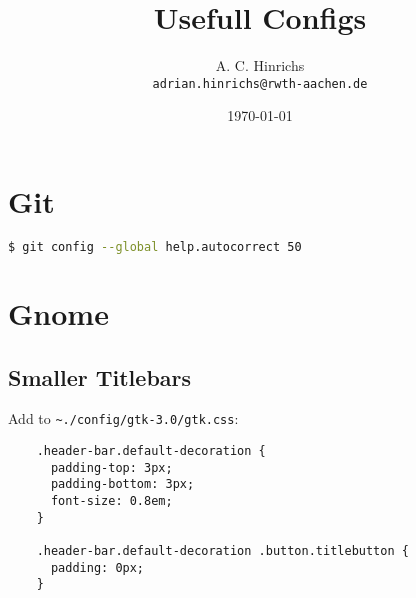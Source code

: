 \documentclass[10pt,landscape,a4paper]{CheatSheet}
\title{Usefull Configs}
\author{A. C. Hinrichs\\\texttt{adrian.hinrichs@rwth-aachen.de}}
\date{\today}
\begin{document}
\begin{multicols}{3}
  \maketitle
  \section{Git}
  \begin{lstlisting}[language=bash]
    $ git config --global help.autocorrect 50
  \end{lstlisting}%

  \section{Gnome}
  \subsection{Smaller Titlebars}
  Add to \lstinline{~./config/gtk-3.0/gtk.css}:
  \begin{lstlisting}
    .header-bar.default-decoration {
      padding-top: 3px;
      padding-bottom: 3px;
      font-size: 0.8em;
    }
    
    .header-bar.default-decoration .button.titlebutton {
      padding: 0px;
    }
  \end{lstlisting}
\end{multicols}
\end{document}
